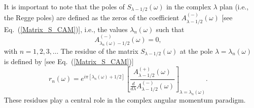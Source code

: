 \documentclass[aps,prd,longbibliography,reprint,twocolumn,amsmath,amssymb,amsfonts,showpacs,superscriptaddress]{revtex4-1}%
\begin{document}
It is important to note that the poles of  $S_{\lambda -1/2} (\omega)$ in the complex $\lambda$ plan (i.e., the Regge poles) are defined  as  the zeros of the coefficient  $A^{(-)}_{\lambda-1/2} (\omega)$ [see Eq.~(\ref{Matrix_S_CAM})], i.e., the values $\lambda_n(\omega)$ such that
\begin{equation}\label{PR_def_Am}
A^{(-)}_{\lambda_n(\omega)-1/2} (\omega)=0,
\end{equation}
with $n=1,2,3,\ldots$
The residue of the matrix $S_{\lambda-1/2}(\omega)$ at the pole $\lambda=\lambda_n(\omega)$ is defined by [see Eq.~(\ref{Matrix_S_CAM})]
\begin{equation}\label{residues_RP}
r_n(\omega)=e^{i\pi [\lambda_n(\omega)+1/2]} \left[ \frac{A_{\lambda -1/2}^{(+)}(\omega)}{\frac{d}{d \lambda}A_{\lambda -1/2}^{(-)}(\omega)}\right]_{\lambda=\lambda_n(\omega)}.
\end{equation}
These residues play a central role in the complex angular momentum paradigm.
\end{document}
